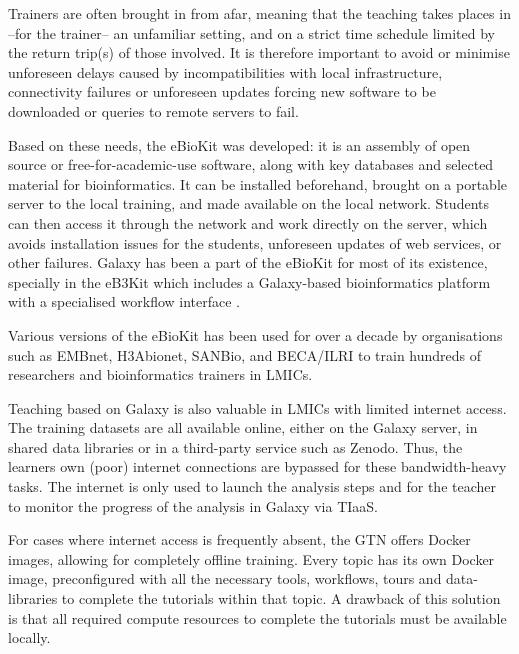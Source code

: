 Trainers are often brought in from afar, meaning that the teaching takes places in --for the trainer-- an unfamiliar setting, and on a strict time schedule limited by the return trip(s) of those involved. It is therefore important to avoid or minimise unforeseen delays caused by incompatibilities with local infrastructure, connectivity failures or unforeseen updates forcing new software to be downloaded or queries to remote servers to fail.

Based on these needs, the eBioKit \cite{Hernandez2017} was developed: it is an assembly of open source or free-for-academic-use software, along with key databases and selected material for bioinformatics. It can be installed beforehand, brought on a portable server to the local training, and made available on the local network. Students can then access it through the network and work directly on the server, which avoids installation issues for the students, unforeseen updates of web services, or other failures. Galaxy has been a part of the eBioKit for most of its existence, specially in the eB3Kit which includes a Galaxy-based bioinformatics platform with a specialised workflow interface \cite{Klingstrom_2017}. %

Various versions of the eBioKit has been used for over a decade by organisations such as EMBnet, H3Abionet, SANBio, and BECA/ILRI to train hundreds of researchers and bioinformatics trainers in LMICs.

Teaching based on Galaxy is also valuable in LMICs with limited internet access. The training datasets are all available online, either on the Galaxy server, in shared data libraries or in a third-party service such as Zenodo. Thus, the learners own (poor) internet connections are bypassed for these bandwidth-heavy tasks. The internet is only used to launch the analysis steps and for the teacher to monitor the progress of the analysis in Galaxy via TIaaS.

For cases where internet access is frequently absent, the GTN offers Docker \cite{Boettiger2015} images, allowing for completely offline training. Every topic has its own Docker image, preconfigured with all the necessary tools, workflows, tours and data-libraries to complete the tutorials within that topic. A drawback of this solution is that all required compute resources to complete the tutorials must be available locally. 

